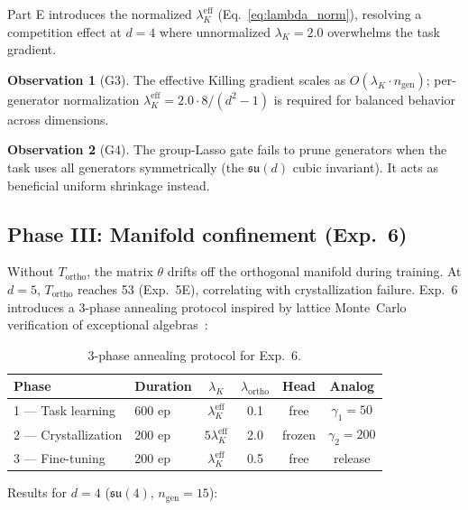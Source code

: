 \documentclass[11pt,a4paper]{article}
\newcommand{\fksu}{\mathfrak{su}}
\newcommand{\Tortho}{T_{\mathrm{ortho}}}
\newcommand{\ngen}{n_{\mathrm{gen}}}
\theoremstyle{definition}
\newtheorem{observation}{Observation}
\begin{document}
Part E introduces the normalized $\lambda_K^{\mathrm{eff}}$ 
(Eq.~\ref{eq:lambda_norm}), resolving a competition effect at $d = 4$ 
where unnormalized $\lambda_K = 2.0$ overwhelms the task gradient.

\begin{observation}[G3]
The effective Killing gradient scales as $O(\lambda_K \cdot \ngen)$; 
per-generator normalization 
$\lambda_K^{\mathrm{eff}} = 2.0 \cdot 8/(d^2-1)$ is required for 
balanced behavior across dimensions.
\end{observation}

\begin{observation}[G4]
The group-Lasso gate fails to prune generators when the task uses all 
generators symmetrically (the $\fksu(d)$ cubic invariant). It acts as 
beneficial uniform shrinkage instead.
\end{observation}


\subsection{Phase III: Manifold confinement (Exp.~6)}
\label{sec:phase3}

Without $\Tortho$, the matrix $\theta$ drifts off the orthogonal 
manifold during training. At $d = 5$, $\Tortho$ reaches 53 (Exp.~5E), 
correlating with crystallization failure. Exp.~6 introduces a 3-phase 
annealing protocol inspired by lattice Monte~Carlo verification of 
exceptional algebras~\cite{moreno2026experimental}:

\begin{table}[H]
\centering
\caption{3-phase annealing protocol for Exp.~6.}
\label{tab:annealing}
\begin{tabular}{llcccc}
\toprule
Phase & Duration & $\lambda_K$ & $\lambda_{\mathrm{ortho}}$ & Head & Analog \\
\midrule
1 --- Task learning & 600 ep & $\lambda_K^{\mathrm{eff}}$ & 0.1 & free & $\gamma_1 = 50$ \\
2 --- Crystallization & 200 ep & $5\lambda_K^{\mathrm{eff}}$ & 2.0 & frozen & $\gamma_2 = 200$ \\
3 --- Fine-tuning & 200 ep & $\lambda_K^{\mathrm{eff}}$ & 0.5 & free & release \\
\bottomrule
\end{tabular}
\end{table}

Results for $d = 4$ ($\fksu(4)$, $\ngen = 15$):
\end{document}
